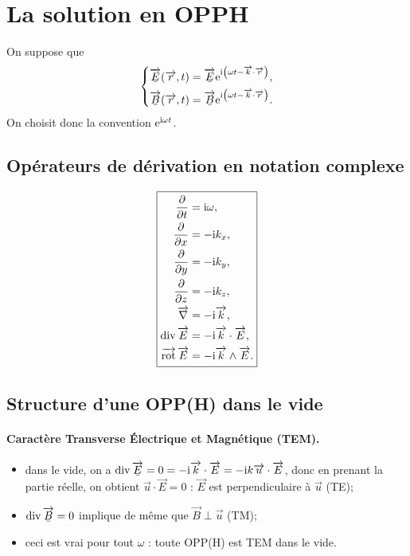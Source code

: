 \section{La solution en OPPH}

On suppose que 
\begin{equation*}
    \left\lbrace
        \begin{aligned}
            \ubar{\vec{E}}(\vec{r},t)&=\ubar{\vec{E}}\rme^{\rmi\left(\omega t-\vec{k}\cdot\vec{r}\right)},\\
            \ubar{\vec{B}}(\vec{r},t)&=\ubar{\vec{B}}\rme^{\rmi\left(\omega t-\vec{k}\cdot\vec{r}\right)}.
        \end{aligned}
    \right.
\end{equation*}
On choisit donc la convention $\mathrm{e}^{\mathrm{i}\omega t}$.

\subsection{Opérateurs de dérivation en notation complexe}

\begin{equation*}
    \boxed{
        \begin{aligned}
            \frac{\partial}{\partial t}&=\mathrm{i}\omega,\\
            \frac{\partial}{\partial x}&=-\mathrm{i} k_x,\\
            \frac{\partial}{\partial y}&=-\mathrm{i} k_y,\\
            \frac{\partial}{\partial z}&=-\mathrm{i} k_z,\\
            \operatorname{\overrightarrow{\nabla}}&=-\mathrm{i}\protect\overrightarrow{{k}},\\
            \operatorname{div}\protect\overrightarrow{{E}}&=-\mathrm{i}\protect\overrightarrow{{k}}\cdot\protect\overrightarrow{{E}},\\
            \operatorname{\overrightarrow{\text{rot}}}\protect\overrightarrow{{E}}&=-\mathrm{i}\protect\overrightarrow{{k}}\wedge\protect\overrightarrow{{E}}.
        \end{aligned}
    }
\end{equation*}

\subsection{Structure d'une OPP(H) dans le vide}

\paragraph{Caractère Transverse Électrique et Magnétique (TEM).}
\begin{itemize}
    \item dans le vide, on a $\div\ubar{\vec{E}}=0=-\rmi\vec{k}\cdot\vec{E}=-\rmi k\vec{u}\cdot\vec{E}$, donc en prenant la partie réelle, on obtient $\vec{u}\cdot\vec{E}=0$ : $\vec{E}$ est perpendiculaire à $\vec{u}$ (TE);
    \item $\div\ubar{\vec{B}}=0$ implique de même que $\vec{B}\perp\vec{u}$ (TM);
    \item ceci est vrai pour tout $\omega$ : toute OPP(H) est TEM dans le vide.
\end{itemize}

